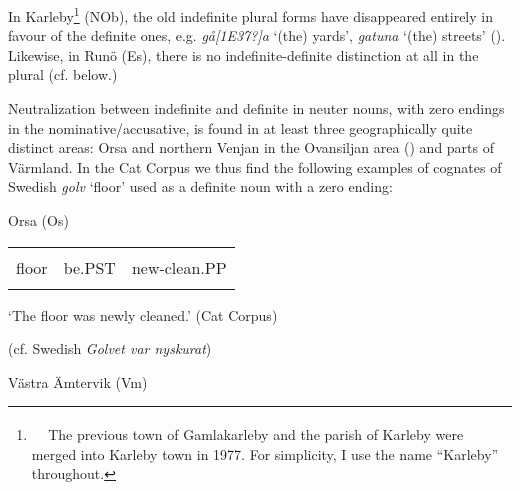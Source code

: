 \begin{styleBodytextC}
In Karleby\footnote{\textsuperscript{\ \ } The previous town of Gamlakarleby and the parish of Karleby were merged into Karleby town in 1977. For simplicity, I use the name “Karleby” throughout. } (NOb), the old indefinite plural forms have disappeared entirely in favour of the definite ones, e.g. \textit{gå[1E37?]a} ‘(the) yards’, \textit{gatuna} ‘(the) streets’ (\citet[93]{Hagfors1891}). Likewise, in Runö (Es), there is no indefinite-definite distinction at all in the plural (cf. below.)

\end{styleBodytextC}

\begin{styleBodytextC}
Neutralization between indefinite and definite in neuter nouns, with zero endings in the nominative/accusative, is found in at least three geographically quite distinct areas: Orsa and northern Venjan in the Ovansiljan area (\citet[133]{Levander1928}) and parts of Värmland. In the Cat Corpus we thus find the following examples of cognates of Swedish \textit{golv} ‘floor’ used as a definite noun with a zero ending:

\end{styleBodytextC}

\begin{listWWNumileveli}
\item {}

\begin{styleExample}
Orsa (Os)

\end{styleExample}

\end{listWWNumileveli}

\begin{tabular}{lll}
\lsptoprule
\multicolumn{3}{l}{{\bfseries Gow}

}\\
floor & be.PST & new-clean.PP\\
\lspbottomrule
\end{tabular}

\begin{styleTranslation}
 ‘The floor was newly cleaned.’ (Cat Corpus)

\end{styleTranslation}

(cf. Swedish \textit{Golvet var nyskurat}) 

\begin{listWWNumileveli}
\item {}

\begin{styleExample}
Västra Ämtervik (Vm)

\end{styleExample}

\end{listWWNumileveli}

